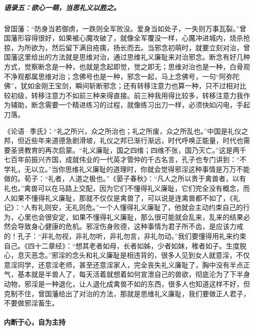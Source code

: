 \subparagraph{语录五：欲心一萌，当思礼义以胜之。}

曾国藩：“防身当若御虏，一跌则全军败没。爱身当如处子，一失则万事瓦裂。”曾国藩形容得很好，如果被心魔攻破了，就像全军覆没一样，心魔冲进城内，烧杀抢掠，为所欲为，然后留下满目疮痍，扬长而去。当邪念初萌时，就要立刻对治，曾国藩这里给出的方法就是思维对治，通过思维礼义廉耻来对治邪念。断念有好几种方式，觉察断念是一种，也就是念起即觉，觉之即无；思维对治也是一种，白骨观不净观都属思维对治；念佛号也是一种，邪念一起，马上念佛号，一句“阿弥陀佛”，犹如金刚王宝剑，瞬间斩断邪念；还有转移注意力也算一种，只不过相对比较初级，转移注意力不如前三种来得直接。前三种我用得比较多，转移注意力我作为辅助，断念需要一个精进练习的过程，就像练习出刀一样，必须快如闪电，手起刀落。

《论语·季氏》：“礼之所兴，众之所治也；礼之所废，众之所乱也。”中国是礼仪之邦，但近些年来道德急剧滑坡，礼仪之邦已渐行渐远，时代呼唤正能量，时代也需要圣贤教育的再次启蒙。“礼义廉耻，国之四维；四维不张，国乃灭亡。”这是两千七百年前振兴齐国，成就伟业的一代英才管仲的千古名言，孔子也专门讲到：“不学礼，无以立。”当你思维礼义廉耻的道理时，你就会觉得邪淫这种事情是万万不能做的。荀子：“礼者，人道之极也。”《晏子春秋》：“凡人之所以贵于禽兽者，以有礼也。”禽兽可以在马路上交配，因为它们不懂得礼义廉耻，它们完全没有概念，而人如果不懂得礼义廉耻，那就不仅仅是禽兽了，可以说是连禽兽都不如了，《礼记》：“人有礼则安，无礼则危。”一个人懂得礼义廉耻了，他就会主动约束自己的行为，心里也会很安定，如果不懂得礼义廉耻，那么很可能就会乱来，乱来的结果必然会导致身心健康的危机。邪淫伤身败德，这种事情为君子所不齿，是应该力戒的！孔子：“非礼勿视，非礼勿听，非礼勿言，非礼勿动。”我们要懂得用礼来约束自己。《四十二章经》：“想其老者如母，长者如姊，少者如妹，稚者如子。生度脱心，息灭恶念。”邪淫的念头和礼义廉耻是相违背的，很多人见到女人就意淫，不仅意淫同学，还意淫老师，甚至还意淫家人，完全丧失礼义廉耻了，胸中没有半点正气，基本就是半兽人了，每天活着就想着如何宣泄自己的兽欲，彻底沦为了下半身动物，邪淫是一种退化，让人退化成禽兽不如的东西，很多人也知道这样不好，但克制不住，曾国藩给出了对治的方法，那就是思维礼义廉耻，我们要做正人君子，不要做邪淫畜生。

\paragraph{内断于心，自为主持}

